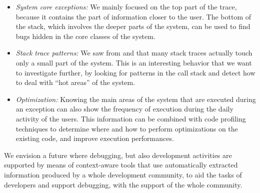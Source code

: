 \begin{itemize}%

\item\textit{System core exceptions:} We mainly focused on the top part of the trace, because it contains the part of information closer to the user. The bottom of the stack, which involves the deeper parts of the system, can be used to find bugs hidden in the core classes of the system.

\item\textit{Stack trace patterns:} We saw from  and  that many stack traces actually touch only a small part of the system. This is an interesting behavior that we want to investigate further, by looking for patterns in the call stack and detect how to deal with ``hot areas'' of the system.

\item\textit{Optimization:} Knowing the main areas of the system that are executed during an exception can also show the frequency of execution during the daily activity of the users. This information can be combined with code profiling techniques to determine where and how to perform optimizations on the existing code, and improve execution performances.
\end{itemize}

We envision a future where debugging, but also development activities are supported by means of context-aware tools that use automatically extracted information produced by a whole development community, to aid the tasks of developers and support debugging, with the support of the whole community.
